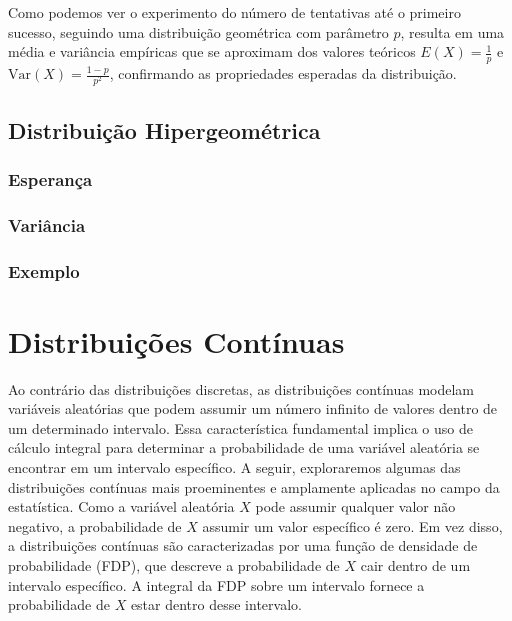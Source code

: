 \documentclass[
]{article}
\begin{document}
Como podemos ver o experimento do número de tentativas até o primeiro sucesso, seguindo uma distribuição geométrica com parâmetro \(p\), resulta em uma média e variância empíricas que se aproximam dos valores teóricos \(E(X) = \frac{1}{p}\) e \(\text{Var}(X) = \frac{1 - p}{p^2}\), confirmando as propriedades esperadas da distribuição.

\hypertarget{distribuiuxe7uxe3o-hipergeomuxe9trica}{%
\subsection{Distribuição Hipergeométrica}\label{distribuiuxe7uxe3o-hipergeomuxe9trica}}

\hypertarget{esperanuxe7a-5}{%
\subsubsection{Esperança}\label{esperanuxe7a-5}}

\hypertarget{variuxe2ncia-5}{%
\subsubsection{Variância}\label{variuxe2ncia-5}}

\hypertarget{exemplo-hgeom}{%
\subsubsection{Exemplo}\label{exemplo-hgeom}}

\hypertarget{distribuiuxe7uxf5es-contuxednuas}{%
\section{Distribuições Contínuas}\label{distribuiuxe7uxf5es-contuxednuas}}

Ao contrário das distribuições discretas, as distribuições contínuas modelam variáveis aleatórias que podem assumir um número infinito de valores dentro de um determinado intervalo. Essa característica fundamental implica o uso de cálculo integral para determinar a probabilidade de uma variável aleatória se encontrar em um intervalo específico. A seguir, exploraremos algumas das distribuições contínuas mais proeminentes e amplamente aplicadas no campo da estatística.
Como a variável aleatória \(X\) pode assumir qualquer valor não negativo, a probabilidade de \(X\) assumir um valor específico é zero. Em vez disso, a distribuições contínuas são caracterizadas por uma função de densidade de probabilidade (FDP), que descreve a probabilidade de \(X\) cair dentro de um intervalo específico. A integral da FDP sobre um intervalo fornece a probabilidade de \(X\) estar dentro desse intervalo.
\end{document}

